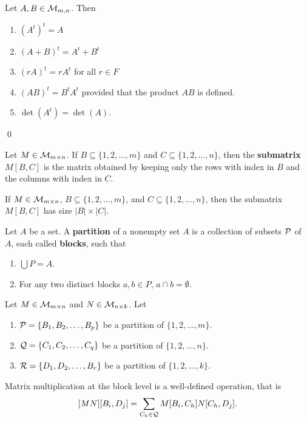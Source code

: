 \begin{theorem}
Let $A,B\in {\mathcal{M}}_{m,n}$. Then
\begin{enumerate}[label=\arabic*)]
\item $(A^t)^t=A$
\item $(A+B)^t=A^t+B^t$
\item $(rA)^t=rA^t$ for all $r\in F$
\item $(AB)^t=B^tA^t$ provided that the product $AB$ is defined.
\item $\det(A^t)=\det(A)$.
\end{enumerate}\qed
\end{theorem}

\begin{definition}
Let $M\in {\mathcal{M}}_{m\times n}$. If $B\subseteq\{1,2,\ldots,m\}$ and $C\subseteq\{1,2,\ldots,n\}$, then the \textbf{submatrix} $M[B,C]$ is the matrix obtained by keeping only the rows with index in $B$ and the columns with index in $C$.
\end{definition}

\begin{proposition}
If $M\in {\mathcal{M}}_{m\times n}$, $B\subseteq\{1,2,\ldots,m\}$, and $C\subseteq\{1,2,\ldots,n\}$, then the submatrix $M[B,C]$ has size $|B|\times|C|$.
\end{proposition}

\begin{definition}
Let $A$ be a set. A \textbf{partition} of a nonempty set $A$ is a collection of subsets ${\mathcal{P}}$ of $A$, each called \textbf{blocks}, such that
\begin{enumerate}[label=\arabic*)]
\item $\bigcup P = A$.
\item For any two distinct blocks $a,b\in P$, $a\cap b = \emptyset$.
\end{enumerate}
\end{definition}

\begin{theorem}
Let $M\in{\mathcal{M}}_{m\times n}$ and $N\in{\mathcal{M}}_{n\times k}$. Let
\begin{enumerate}[label=\arabic*)]
\item ${\mathcal{P}}=\{B_1,B_2,\ldots,B_p\}$ be a partition of $\{1,2,\ldots,m\}$.
\item ${\mathcal{Q}}=\{C_1,C_2,\ldots,C_q\}$ be a partition of $\{1,2,\ldots,n\}$.
\item ${\mathcal{R}}=\{D_1,D_2,\ldots,B_r\}$ be a partition of $\{1,2,\ldots,k\}$.
\end{enumerate}
Matrix multiplication at the block level is a well-defined operation, that is
\[[MN][B_i,D_j]=\sum_{C_h\in{\mathcal{Q}}}M[B_i,C_h]N[C_h,D_j].\]
\end{theorem}

